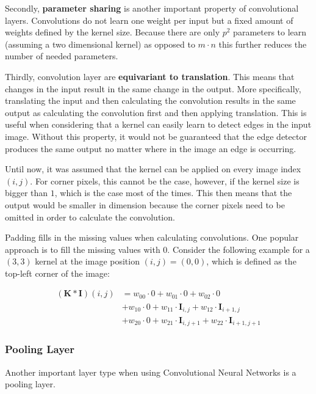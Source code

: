 Secondly, \textbf{parameter sharing} is another important property of convolutional layers.
Convolutions do not learn one weight per input but a fixed amount of weights defined by the kernel size.
Because there are only $p^2$ parameters to learn (assuming a two dimensional kernel) as opposed to $m \cdot n$ this further reduces the number of needed parameters.

Thirdly, convolution layer are \textbf{equivariant to translation}.
This means that changes in the input result in the same change in the output.
More specifically, translating the input and then calculating the convolution results in the same output as calculating the convolution first and then applying translation.
This is useful when considering that a kernel can easily learn to detect edges in the input image.
Without this property, it would not be guaranteed that the edge detector produces the same output no matter where in the image an edge is occurring.

Until now, it was assumed that the kernel can be applied on every image index $(i,j)$.
For corner pixels, this cannot be the case, however, if the kernel size is bigger than $1$, which is the case most of the times.
This then means that the output would be smaller in dimension because the corner pixels need to be omitted in order to calculate the convolution.

Padding fills in the missing values when calculating convolutions.
One popular approach is to fill the missing values with $0$. Consider the following example for a $(3,3)$ kernel at the image position $(i,j) = (0,0)$, which is defined as the top-left corner of the image:

\begin{equation}
    \begin{split}
        (\bm{K} * \bm{I})(i,j)
        &= w_{00} \cdot 0 + w_{01} \cdot 0 + w_{02} \cdot 0 \\
        &+ w_{10} \cdot 0 + w_{11} \cdot \bm{I}_{i,j} + w_{12} \cdot \bm{I}_{i+1,j} \\
        &+ w_{20} \cdot 0 + w_{21} \cdot \bm{I}_{i,j+1} + w_{22} \cdot \bm{I}_{i+1,j+1}
    \end{split}
\end{equation}






\subsubsection{Pooling Layer}
Another important layer type when using Convolutional Neural Networks is a pooling layer.

